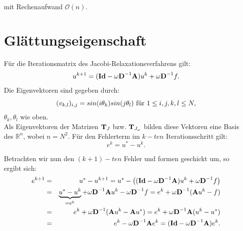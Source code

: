 mit Rechenaufwand $\mathcal{O}(n)$.

\section{Glättungseigenschaft}\label{s.Glättungseigenschaft}

Für die Iterationsmatrix des Jacobi-Relaxationsverfahrens gilt:
\begin{equation}
u^{k+1} = ({\textbf{Id}} - \omega {\textbf{D}}^{-1}{\textbf{A}})u^{k} + \omega {\textbf{D}}^{-1}f.
\end{equation}
Die Eigenvektoren sind gegeben durch:
\begin{equation}
(v_{k,l})_{i,j} = sin(i \theta_{k})sin(j \theta_{l}) \textnormal{ für } 1 \le i,j,k,l \le N,
\end{equation}
$\theta_{k}, \theta_{l}$ wie oben.\\
Als Eigenvektoren der Matrizen ${\textbf{T}}_{J}$ bzw. ${\textbf{T}}_{J_{\omega}}$ bilden diese Vektoren eine Basis des $\mathbb{R}^{n}$, wobei $n = N^{2}$.
Für den Fehlerterm im $k-ten$ Iterationsschritt gilt:
\begin{equation}
e^{k} = u^{*} - u^{k}.
\end{equation}

Betrachten wir nun den $(k+1)-ten$ Fehler und formen geschickt um, so ergibt sich:
\begin{eqnarray}
e^{k+1} &=& u^{*} - u^{k+1} = u^{*} - \left( ({\textbf{Id}} - \omega {\textbf{D}}^{-1} {\textbf{A}})u^{k} + \omega {\textbf{D}}^{-1}f \right) \notag \\
&=& \underbrace{u^{*} - u^{k}}_{= e^{k}} + \omega {\textbf{D}}^{-1} {\textbf{A}} u^{k} - \omega {\textbf{D}}^{-1}f = e^{k} + \omega {\textbf{D}}^{-1} ({\textbf{A}}u^{k} - f) \notag \\
&=& e^{k} + \omega {\textbf{D}}^{-1} ({\textbf{A}}u^{k} - {\textbf{A}}u^{*}) = e^{k} + \omega {\textbf{D}}^{-1} {\textbf{A}}(u^{k} - u^{*}) \notag \\
&=& e^{k} - \omega {\textbf{D}}^{-1} {\textbf{A}} e^{k} = ({\textbf{Id}} - \omega {\textbf{D}}^{-1} {\textbf{A}}) e^{k}.
\end{eqnarray}


